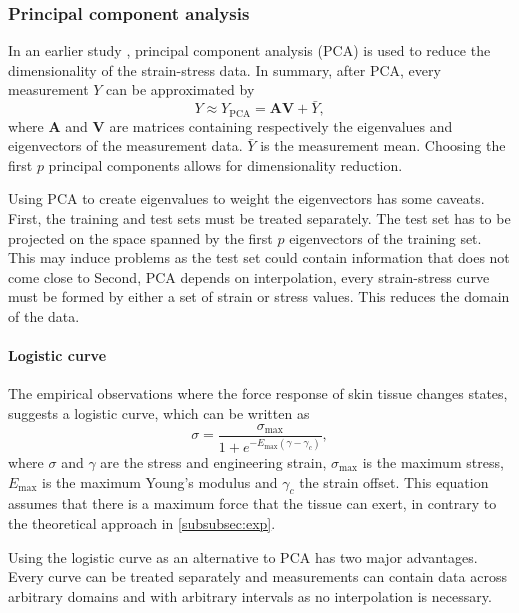 \subsubsection{Principal component analysis}
In an earlier study , principal component analysis (PCA) is used to reduce the dimensionality of the strain-stress data.
In summary, after PCA, every measurement $Y$ can be approximated by
\begin{equation}\label{eq:pca}
    Y \approx Y_\mathrm{PCA} = \mathbf{A} \mathbf{V} + \bar{Y},
\end{equation}
where $\mathbf{A}$ and $\mathbf{V}$ are matrices containing respectively the eigenvalues and eigenvectors of the measurement data.
$\bar{Y}$ is the measurement mean.
Choosing the first $p$ principal components allows for dimensionality reduction.

Using PCA to create eigenvalues to weight the eigenvectors has some caveats.
First, the training and test sets must be treated separately.
The test set has to be projected on the space spanned by the first $p$ eigenvectors of the training set.
This may induce problems as the test set could contain information that does not come close to
Second, PCA depends on interpolation, \ie every strain-stress curve must be formed by either a set of strain or stress values.
This reduces the domain of the data.

\paragraph{Logistic curve}
The empirical observations where the force response of skin tissue changes states, suggests a logistic curve, which can be written as
\begin{equation}\label{eq:logistic_curve}
    \sigma = \frac{\sigma_\mathrm{max}}{1+e^{-E_\mathrm{max} (\gamma - \gamma_c)}},
\end{equation}
where $\sigma$ and $\gamma$ are the stress and engineering strain, $\sigma_\mathrm{max}$ is the maximum stress, $E_\mathrm{max}$ is the maximum Young's modulus and $\gamma_c$ the strain offset.
This equation assumes that there is a maximum force that the tissue can exert, in contrary to the theoretical approach in \cref{subsubsec:exp}.

Using the logistic curve as an alternative to PCA has two major advantages.
Every curve can be treated separately and measurements can contain data across arbitrary domains and with arbitrary intervals as no interpolation is necessary.

